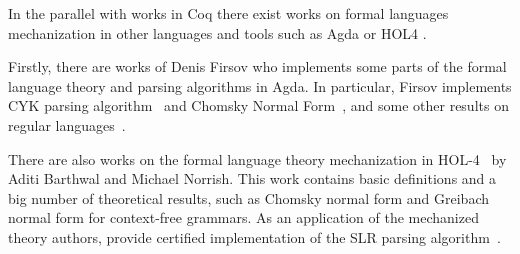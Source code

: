 In the parallel with works in Coq there exist works on formal languages mechanization in other languages and tools such as Agda \cite{firsov2016cfl} or HOL4 \cite{barthwal2010formalisation}.

Firstly, there are works of Denis Firsov who implements some parts of the formal language theory and parsing algorithms in Agda.
In particular, Firsov implements CYK parsing algorithm~\cite{firsov2014certified,firsov2016cfl} and Chomsky Normal Form~\cite{firsov2015certified}, and some other results on regular languages~\cite{10.1007/978-3-319-03545-1_7}.

There are also works on the formal language theory mechanization in HOL-4~\cite{1885-16399,barthwal2010formalisation,10.1007/978-3-642-13824-9_11} by Aditi Barthwal and Michael Norrish.
This work contains basic definitions and a big number of theoretical results, such as Chomsky normal form and Greibach normal form for context-free grammars. 
As an application of the mechanized theory authors, provide certified implementation of the SLR parsing algorithm~\cite{10.1007/978-3-642-00590-9_12}.




